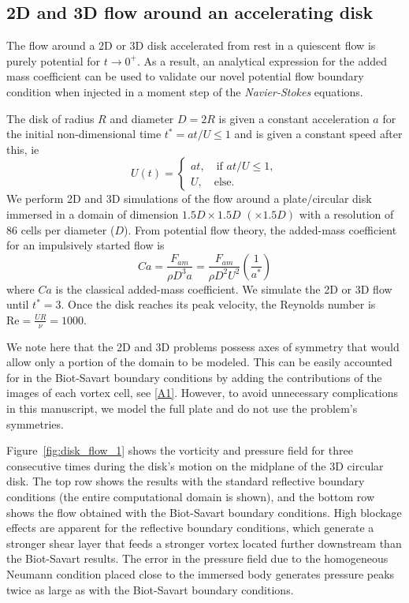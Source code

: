 \documentclass[final,1p,times]{elsarticle}
\begin{document}
\subsection{2D and 3D flow around an accelerating disk}

The flow around a 2D or 3D disk accelerated from rest in a quiescent flow is purely potential for $t\to 0^+$. As a result, an analytical expression for the added mass coefficient can be used to validate our novel potential flow boundary condition when injected in a moment step of the \emph{Navier-Stokes} equations. 

The disk of radius $R$ and diameter $D=2R$ is given a constant acceleration $a$ for the initial non-dimensional time $t^*=at/U\le 1$ and is given a constant speed after this, ie
\begin{equation}
    U(t) = \begin{cases}
        at, \quad \text{if } at/U\le1,\\
        U, \quad \text{else}.
    \end{cases}
\end{equation}
We perform 2D and 3D simulations of the flow around a plate/circular disk immersed in a domain of dimension $1.5D\times1.5D\,\,(\times1.5D)$ with a resolution of 86 cells per diameter ($D$). From potential flow theory, the added-mass coefficient for an impulsively started flow is
\begin{equation}
    Ca  = \frac{F_{am}}{\rho D^3 a} = \frac{F_{am}}{\rho D^2U^2}\left(\frac{1}{a^*}\right) %
\end{equation}
where $Ca$ is the classical added-mass coefficient. We simulate the 2D or 3D flow until $t^*=3$. Once the disk reaches its peak velocity, the Reynolds number is $\text{Re}=\frac{UR}{\nu}=1000$.

We note here that the 2D and 3D problems possess axes of symmetry that would allow only a portion of the domain to be modeled. This can be easily accounted for in the Biot-Savart boundary conditions by adding the contributions of the images of each vortex cell, see \ref{A1}. However, to avoid unnecessary complications in this manuscript, we model the full plate and do not use the problem's symmetries.

Figure~\ref{fig:disk_flow_1} shows the vorticity and pressure field for three consecutive times during the disk's motion on the midplane of the 3D circular disk. The top row shows the results with the standard reflective boundary conditions (the entire computational domain is shown), and the bottom row shows the flow obtained with the Biot-Savart boundary conditions. High blockage effects are apparent for the reflective boundary conditions, which generate a stronger shear layer that feeds a stronger vortex located further downstream than the Biot-Savart results. The error in the pressure field due to the homogeneous Neumann condition placed close to the immersed body generates pressure peaks twice as large as with the Biot-Savart boundary conditions.
\end{document}
